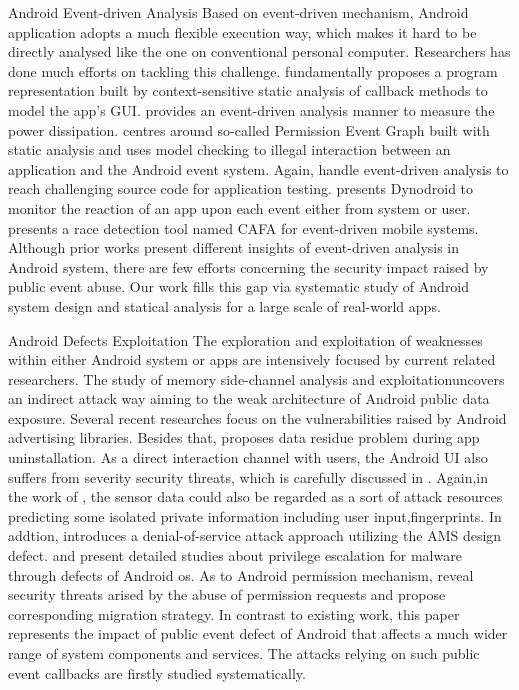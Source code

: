 \documentclass{sig-alternate-05-2015}
\begin{document}
Android Event-driven Analysis
Based on event-driven mechanism, Android application adopts a much flexible execution way, which makes it hard to be directly analysed like the one on conventional personal computer. Researchers has done much efforts on tackling this challenge. \cite{yang2015static} fundamentally proposes a program representation built by context-sensitive static analysis of callback methods to model the app's GUI. \cite{kim2014fepma} provides an event-driven analysis manner to measure the power dissipation.  \cite{chen2013contextual} centres around so-called Permission Event Graph built with static analysis and uses model checking to illegal interaction between an application and the Android event system. Again, \cite{jensen2013automated} handle event-driven analysis to reach challenging source code for application testing. \cite{machiry2013dynodroid} presents Dynodroid to monitor the reaction of an app upon each event either from system or user. \cite{hsiao2014race}presents a race detection tool named CAFA for event-driven mobile systems. Although prior works present different insights of event-driven analysis in Android system, there are few efforts concerning the security impact raised by public event abuse. Our work fills this gap via systematic study of Android system design and statical analysis for a large scale of real-world apps.

Android Defects Exploitation
The exploration and exploitation of weaknesses within either Android system or apps are intensively focused by current related researchers. The study of memory side-channel analysis and exploitation\cite{zhou2013identity, chen2014peeking, jana2012memento}uncovers an indirect attack way aiming to the weak architecture of Android public data exposure.
Several recent researches focus on the vulnerabilities raised by Android advertising libraries\cite{soteris2016free}\cite{sooel2016mob_ads}. Besides that, \cite{zhang2016life} proposes data residue problem during app uninstallation. As a direct interaction channel with users, the Android UI also suffers from severity security threats, which is carefully discussed in \cite{ren2015towards}\cite{bianchi2015app}\cite{akhawe2014clickjacking}\cite{luo2012touchjacking}\cite{huang2012clickjacking}\cite{roesner2013securing}\cite{lin2014screenmilker}. 
Again,in the work of \cite{mylonas2013smartphone}\cite{xu2012taplogger}\cite{miluzzo2012tapprints}, the sensor data could also be regarded as a sort of attack resources predicting some isolated private information including user input,fingerprints. In addtion, \cite{armando2012dos} introduces a denial-of-service attack approach utilizing the AMS design defect. \cite{xing2014upgrading} and \cite{bugiel2012towards} present detailed studies about privilege escalation for malware through defects of Android os.  As to Android permission mechanism, \cite{felt2011android}\cite{au2012pscout}\cite{zhang2013vetting}\cite{fang2014permission} reveal security threats arised by the abuse of permission requests and propose corresponding migration strategy.
In contrast to existing work, this paper represents the impact of public event defect of Android that affects a much wider range of system components and services. The attacks relying on such public event callbacks are firstly studied systematically.
\end{document}
